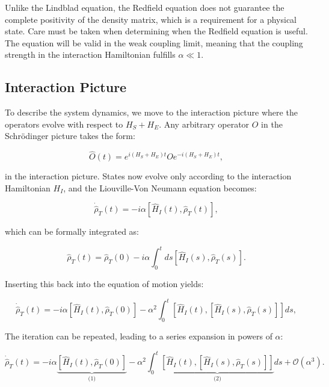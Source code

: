 Unlike the Lindblad equation, the Redfield equation does not guarantee the complete positivity of the density matrix, which is a requirement for a physical state. Care must be taken when determining when the Redfield equation is useful. The equation will be valid in the weak coupling limit, meaning that the coupling strength in the interaction Hamiltonian fulfills $\alpha \ll 1$.

\subsection{Interaction Picture}

To describe the system dynamics, we move to the interaction picture where the operators evolve with respect to $H_S + H_E$. Any arbitrary operator $O$ in the Schrödinger picture takes the form:

\begin{equation}
    \hat{O}(t) = e^{i(H_S+H_E)t} O e^{-i(H_S+H_E)t},
    \label{eq:Interaction_Picture_Operators}
\end{equation}

in the interaction picture. States now evolve only according to the interaction Hamiltonian $H_I$, and the Liouville-Von Neumann equation becomes:

\begin{equation}
    \dot{\hat{\rho}}_T(t) = -i \alpha [\hat{H}_I(t), \hat{\rho}_T(t)],
    \label{eq:LiouvilleVN}
\end{equation}

which can be formally integrated as:

\begin{equation}
    \hat{\rho}_T(t) = \hat{\rho}_T(0) - i \alpha \int_0^t ds [\hat{H}_I(s), \hat{\rho}_T(s)].
    \label{eq:Formal_Integration}
\end{equation}

Inserting this back into the equation of motion yields:

\begin{equation}
    \dot{\hat{\rho}}_T(t) = -i \alpha \left[ \hat{H}_I(t), \hat{\rho}_T(0) \right]
    - \alpha^2 \int_0^t \left[ \hat{H}_I(t), \left[ \hat{H}_I(s), \hat{\rho}_T(s) \right] \right] ds,
    \label{eq:Second_Order_Expansion}
\end{equation}

The iteration can be repeated, leading to a series expansion in powers of $\alpha$:

\begin{equation}
    \dot{\hat{\rho}}_T(t) = -i \alpha \underbrace{\left[ \hat{H}_I(t), \hat{\rho}_T(0) \right]}_{\text{(1)}}
    - \alpha^2 \int_0^t \underbrace{\left[ \hat{H}_I(t), \left[ \hat{H}_I(s), \hat{\rho}_T(s) \right] \right]}_{\text{(2)}} ds + \mathcal{O} (\alpha^3).
    \label{eq:Second_Order_Expansion_truncated}
\end{equation}

